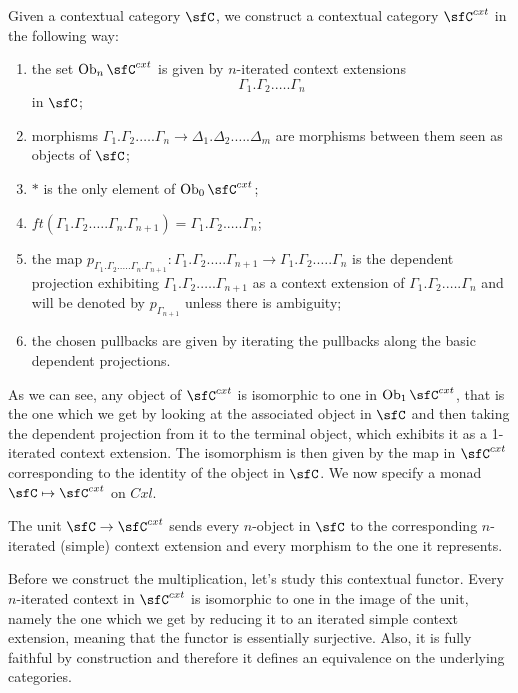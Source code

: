 \begin{construction}\cite[21]{Lum10}
  Given a contextual category $\sfC$, we construct a contextual category
  $\sfC^{cxt}$ in the following way:
  \begin{enumerate}
    \item the set $\Ob_n\sfC^{cxt}$ is given by $n$-iterated context extensions
      \[\Gamma_1.\Gamma_2.\ldots.\Gamma_n\]
      in $\sfC$;
    \item morphisms
      $\Gamma_1.\Gamma_2.\ldots.\Gamma_n\rightarrow\Delta_1.\Delta_2.\ldots.\Delta_m$
      are morphisms between them seen as objects of $\sfC$;
    \item $*$ is the only element of $\Ob_0\sfC^{cxt}$;
    \item
      $ft(\Gamma_1.\Gamma_2.\ldots.\Gamma_n.\Gamma_{n+1})=\Gamma_1.\Gamma_2.\ldots.\Gamma_n$;
    \item the map $p_{\Gamma_1.\Gamma_2.\ldots.\Gamma_n.\Gamma_{n+1}}\colon
      \Gamma_1.\Gamma_2.\ldots.\Gamma_{n+1}\rightarrow
      \Gamma_1.\Gamma_2.\ldots.\Gamma_n$ is the dependent projection exhibiting
      $\Gamma_1.\Gamma_2.\ldots.\Gamma_{n+1}$ as a context extension of
      $\Gamma_1.\Gamma_2.\ldots.\Gamma_n$ and will be denoted by
      $p_{\Gamma_{n+1}}$ unless there is ambiguity;
    \item the chosen pullbacks are given by iterating the pullbacks along the
      basic dependent projections.
  \end{enumerate}

  As we can see, any object of $\sfC^{cxt}$ is isomorphic to one in
  $\Ob_1\sfC^{cxt}$, that is the one which we get by looking at the associated object
  in $\sfC$ and then taking the dependent projection from it to the terminal
  object, which exhibits it as a 1-iterated context extension. The isomorphism
  is then given by the map in $\sfC^{cxt}$ corresponding to the identity of the
  object in $\sfC$. We now specify a monad $\sfC\mapsto\sfC^{cxt}$ on $Cxl$.

  The unit $\sfC\rightarrow\sfC^{cxt}$ sends every $n$-object in $\sfC$ to
  the corresponding $n$-iterated (simple) context extension and every morphism
  to the one it represents.

  Before we construct the multiplication, let's study this contextual functor.
  Every $n$-iterated
  context in $\sfC^{cxt}$ is isomorphic to one in the image of the unit, namely
  the one which we get by reducing it to an iterated simple context extension,
  meaning that the functor is essentially surjective. Also, it is fully faithful
  by construction and therefore it defines an equivalence on the underlying
  categories.


\end{construction}
